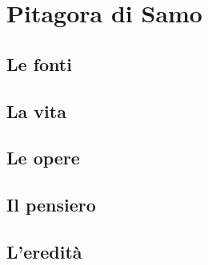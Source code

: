 \chapter{Pitagora di Samo}

\section{Le fonti}

\section{La vita}

\section{Le opere}

\section{Il pensiero}

\section{L'eredità}
